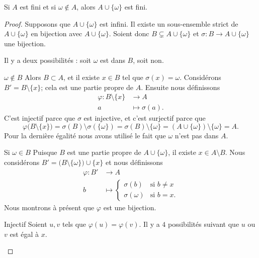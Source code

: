\begin{proposition}      \label{PROPooVOKDooOStPzU}
    Si \( A\) est fini et si \( \omega\notin A\), alors \( A\cup\{ \omega \}\) est fini.
\end{proposition}

\begin{proof}
    Supposons que \( A\cup\{ \omega \}\) est infini. Il existe un sous-ensemble strict de \( A\cup\{ \omega \}\) en bijection avec \( A\cup\{ \omega \}\). Soient donc \( B\subsetneq A\cup\{ \omega \}\) et \( \sigma\colon B\to A\cup\{ \omega \}\) une bijection.

    Il y a deux possibilités : soit \( \omega\) est dans \( B\), soit non.

    \begin{subproof}
    \item[\( \omega\notin B\)]
        Alors \( B\subset A\), et il existe \( x\in B\) tel que \( \sigma(x)=\omega\). Considérons \( B'=B\setminus\{ x \}\); cela est une partie propre de \( A\). Ensuite nous définissons
        \begin{equation}
            \begin{aligned}
                \varphi\colon B\setminus\{ x \}&\to A \\
                a&\mapsto \sigma(a). 
            \end{aligned}
        \end{equation}
        C'est injectif parce que \( \sigma\) est injective, et c'est surjectif parce que
        \begin{equation}
            \varphi\big( B\setminus\{ x \} \big)=\sigma(B)\setminus\sigma(\{ \omega \})=\sigma(B)\setminus\{ \omega \}=(A\cup\{ \omega \})\setminus\{ \omega \}=A.
        \end{equation}
        Pour la dernière égalité nous avons utilisé le fait que \( \omega\) n'est pas dans \( A\).
    \item[Si \( \omega\in B\)]
        Puisque \( B\) est une partie propre de \( A\cup\{ \omega \}\), il existe \( x\in A\setminus B\). Nous considérons \( B'=\big( B\setminus\{ \omega \} \big)\cup\{ x \}\) et nous définissons
        \begin{equation}
            \begin{aligned}
                \varphi\colon B'&\to A \\
                b&\mapsto \begin{cases}
                    \sigma(b)    &   \text{si } b\neq x\\
                    \sigma(\omega)    &    \text{si } b=x.
                \end{cases}
            \end{aligned}
        \end{equation}
        Nous montrons à présent que \( \varphi\) est une bijection. 
        \begin{subproof}
        \item[Injectif]
            Soient \( u,v\) tels que \( \varphi(u)=\varphi(v)\). Il y a \( 4\) possibilités suivant que \( u\) ou \( v\) est égal à \( x\).


\end{subproof}
\end{subproof}
\end{proof}
